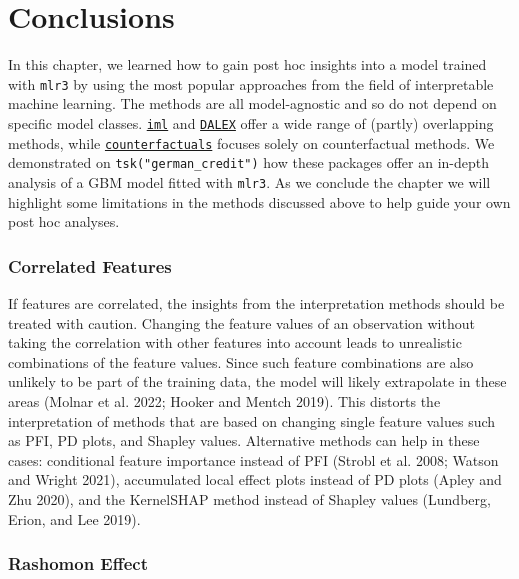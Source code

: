 \hypertarget{conclusions}{%
\section{Conclusions}\label{conclusions}}

In this chapter, we learned how to gain post hoc insights into a model
trained with \texttt{mlr3} by using the most popular approaches from the
field of interpretable machine learning. The methods are all
model-agnostic and so do not depend on specific model classes.
\href{https://cran.r-project.org/package=iml}{\texttt{iml}} and
\href{https://cran.r-project.org/package=DALEX}{\texttt{DALEX}} offer a
wide range of (partly) overlapping methods, while
\href{https://cran.r-project.org/package=counterfactuals}{\texttt{counterfactuals}}
focuses solely on counterfactual methods. We demonstrated on
\texttt{tsk("german\_credit")} how these packages offer an in-depth
analysis of a GBM model fitted with \texttt{mlr3}. As we conclude the
chapter we will highlight some limitations in the methods discussed
above to help guide your own post hoc analyses.

\hypertarget{correlated-features}{%
\subsubsection*{Correlated Features}\label{correlated-features}}

If features are correlated, the insights from the interpretation methods
should be treated with caution. Changing the feature values of an
observation without taking the correlation with other features into
account leads to unrealistic combinations of the feature values. Since
such feature combinations are also unlikely to be part of the training
data, the model will likely extrapolate in these areas (Molnar et al.
2022; Hooker and Mentch 2019). This distorts the interpretation of
methods that are based on changing single feature values such as PFI, PD
plots, and Shapley values. Alternative methods can help in these cases:
conditional feature importance instead of PFI (Strobl et al. 2008;
Watson and Wright 2021), accumulated local effect plots instead of PD
plots (Apley and Zhu 2020), and the KernelSHAP method instead of Shapley
values (Lundberg, Erion, and Lee 2019).

\hypertarget{rashomon-effect}{%
\subsubsection*{Rashomon Effect}\label{rashomon-effect}}


